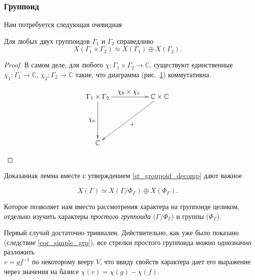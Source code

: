 \subsubsection{Группоид}
    Нам потребуется следующая очевидная

    \begin{lemma}\label{lm_char_decomp}
        Для любых двух группоидов $\Gamma_1$ и $\Gamma_2$ справедливо
        \[X(\Gamma_1 \times \Gamma_2) \simeq X(\Gamma_1) \oplus X(\Gamma_2).\]
    \end{lemma}
    \begin{proof}
        В самом деле, для любого $\chi : \Gamma_1 
        \times \Gamma_2 \to \mathbb{C}$, существуют единственные
        $\chi_1 : \Gamma_1 \to \mathbb{C}$, $\chi_2 : \Gamma_2 \to \mathbb{C}$ 
        такие, что диаграмма (рис.~\ref{cd_char_sum}) коммутативна.

        \begin{figure}[h]
            \centering
            \[\xymatrix{
                \Gamma_1 \times \Gamma_2 \ar[rr]^{\textstyle \chi_b \times \chi_c} \ar[dd]_{\textstyle \chi_a}  & & \mathbb{C} \times \mathbb{C} \ar[lldd]^{\textstyle +}\\
                                                                                                                & &                                                      \\
                \mathbb{C}                                                                                      & &
            }\]
            \caption{}
            \label{cd_char_sum}
        \end{figure}
    \end{proof}

    Доказанная лемма вместе с утверждением \ref{st_groupoid_decomp} 
    дают важное
    \begin{statement}\label{st_char_grpd_decomp}
        \[X(\Gamma) \simeq X(\Gamma/\Phi_\Gamma) \oplus X(\Phi_\Gamma).\]
    \end{statement}

    Которое позволяет нам вместо рассмотрения характера на группоиде целиком,
    отдельно изучить характеры \emph{простого группоида} ($\Gamma/\Phi_\Gamma$) и
    группы ($\Phi_\Gamma$).

    Первый случай достаточно тривиален. Действительно, как уже было показано 
    (следствие \ref{cor_simple_grp}), все стрелки простого 
    группоида можно однозначно разложить\\ $v = gf^{-1}$ по некоторому вееру $V$,
    что ввиду свойств характера дает его выражение через значения на базисе 
    $\chi(v) = \chi(g) - \chi(f)$.

